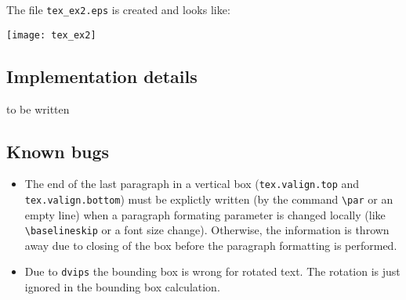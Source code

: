 The file \verb|tex_ex2.eps| is created and looks like:

\bigskip
\texttt{[image: tex\_ex2]}

\subsection{Implementation details}
to be written

\subsection{Known bugs}
\begin{itemize}
\item The end of the last paragraph in a vertical box
(\verb|tex.valign.top| and \verb|tex.valign.bottom|) must be explictly
written (by the command \verb|\par| or an empty line) when a paragraph
formating parameter is changed locally (like \verb|\baselineskip| or a
font size change).  Otherwise, the information is thrown away due to
closing of the box before the paragraph formatting is performed.
\item Due to \verb|dvips| the bounding box is wrong for rotated text.
The rotation is just ignored in the bounding box calculation.
\end{itemize}
